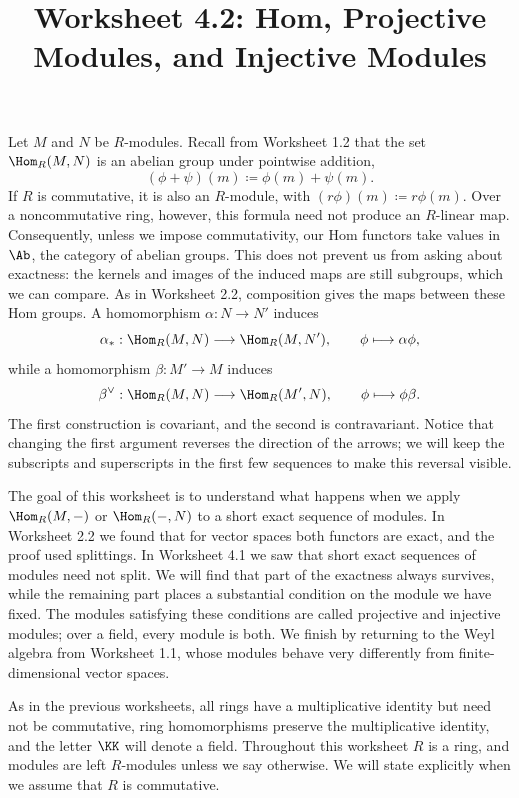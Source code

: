 \documentclass[12pt,reqno]{amsart}
\title{Worksheet 4.2: Hom, Projective Modules, and Injective Modules}
\begin{document}
\maketitle
\thispagestyle{firstpage}

Let $M$ and $N$ be $R$-modules. Recall from Worksheet 1.2 that the set $\Hom_R(M,N)$ is an abelian group under pointwise addition,
\[
(\phi+\psi)(m)\coloneqq\phi(m)+\psi(m).
\]
If $R$ is commutative, it is also an $R$-module, with $(r\phi)(m)\coloneqq r\phi(m)$. Over a noncommutative ring, however, this formula need not produce an $R$-linear map. Consequently, unless we impose commutativity, our Hom functors take values in $\Ab$, the category of abelian groups. This does not prevent us from asking about exactness: the kernels and images of the induced maps are still subgroups, which we can compare. As in Worksheet 2.2, composition gives the maps between these Hom groups. A homomorphism $\alpha:N\to N'$ induces
\[
\alpha_*:\Hom_R(M,N)\longrightarrow\Hom_R(M,N'),\qquad\phi\longmapsto\alpha\phi,
\]
while a homomorphism $\beta:M'\to M$ induces
\[
\beta^{\vee}:\Hom_R(M,N)\longrightarrow\Hom_R(M',N),\qquad\phi\longmapsto\phi\beta.
\]
The first construction is covariant, and the second is contravariant. Notice that changing the first argument reverses the direction of the arrows; we will keep the subscripts and superscripts in the first few sequences to make this reversal visible.

The goal of this worksheet is to understand what happens when we apply $\Hom_R(M,-)$ or $\Hom_R(-,N)$ to a short exact sequence of modules. In Worksheet 2.2 we found that for vector spaces both functors are exact, and the proof used splittings. In Worksheet 4.1 we saw that short exact sequences of modules need not split. We will find that part of the exactness always survives, while the remaining part places a substantial condition on the module we have fixed. The modules satisfying these conditions are called projective and injective modules; over a field, every module is both. We finish by returning to the Weyl algebra from Worksheet 1.1, whose modules behave very differently from finite-dimensional vector spaces.

As in the previous worksheets, all rings have a multiplicative identity but need not be commutative, ring homomorphisms preserve the multiplicative identity, and the letter $\KK$ will denote a field. Throughout this worksheet $R$ is a ring, and modules are left $R$-modules unless we say otherwise. We will state explicitly when we assume that $R$ is commutative.
\end{document}
